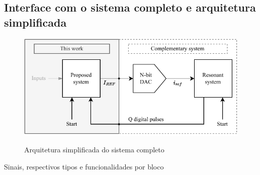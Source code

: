 \subsection{Interface com o sistema completo e arquitetura simplificada}\label{sec-interface}


\begin{frame}

\begin{figure}[H]
    \centering
    \caption{Arquitetura simplificada do sistema completo}
    \includegraphics[width=.6\textwidth]{fig/arq-simplif.pdf}
    \label{f-arq-simplif}
\end{figure}%
\vspace*{-8pt}
\begin{table}[H]
    \centering
    \caption{Sinais, respectivos tipos e funcionalidades por bloco}
    
    \label{tab-arq-simplif}
\end{table}

\vspace*{-12pt}
\flushright
\scriptsize
\insertframenumber~\frameofframes~\inserttotalframenumber
    
\end{frame}


    



